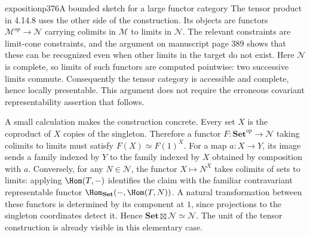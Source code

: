 \begin{dcomment}{exposition}{p376}{A bounded sketch for a large functor category}
The tensor product in 4.14.8 uses the other side of the construction. Its objects are functors $\mathcal M^{op}\to\mathcal N$ carrying colimits in $\mathcal M$ to limits in $\mathcal N$. The relevant constraints are limit-cone constraints, and the argument on manuscript page 389 shows that these can be recognized even when other limits in the target do not exist. Here $\mathcal N$ is complete, so limits of such functors are computed pointwise: two successive limits commute. Consequently the tensor category is accessible and complete, hence locally presentable. This argument does not require the erroneous covariant representability assertion that follows.

A small calculation makes the construction concrete. Every set $X$ is the coproduct of $X$ copies of the singleton. Therefore a functor $F:\mathbf{Set}^{op}\to\mathcal N$ taking colimits to limits must satisfy $F(X)\simeq F(1)^X$. For a map $a:X\to Y$, its image sends a family indexed by $Y$ to the family indexed by $X$ obtained by composition with $a$. Conversely, for any $N\in\mathcal N$, the functor $X\mapsto N^X$ takes colimits of sets to limits: applying $\Hom(T,-)$ identifies the claim with the familiar contravariant representable functor $\Hom_{\mathbf{Set}}(-,\Hom(T,N))$. A natural transformation between these functors is determined by its component at $1$, since projections to the singleton coordinates detect it. Hence $\mathbf{Set}\boxtimes\mathcal N\simeq\mathcal N$. The unit of the tensor construction is already visible in this elementary case.
\end{dcomment}

